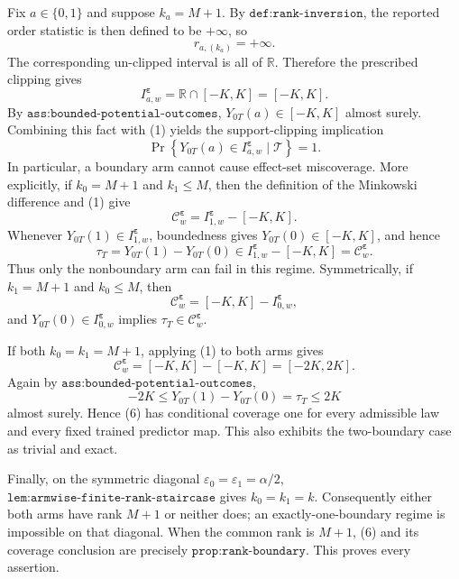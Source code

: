 Fix \(a\in\{0,1\}\) and suppose \(k_a=M+1\). By \(\texttt{def:rank-inversion}\), the reported order statistic is then defined to be \(+\infty\), so
\[
r_{a,(k_a)}=+\infty.
\]
The corresponding un-clipped interval is all of \(\mathbb R\). Therefore the prescribed clipping gives
\[
I^{\boldsymbol\varepsilon}_{a,w}=\mathbb R\cap[-K,K]=[-K,K].
\tag{1}
\]
By \(\texttt{ass:bounded-potential-outcomes}\), \(Y_{0T}(a)\in[-K,K]\) almost surely. Combining this fact with (1) yields the support-clipping implication
\[
\Pr\!\left\{Y_{0T}(a)\in I^{\boldsymbol\varepsilon}_{a,w}\mid\mathcal T\right\}=1.
\tag{2}
\]
In particular, a boundary arm cannot cause effect-set miscoverage. More explicitly, if \(k_0=M+1\) and \(k_1\le M\), then the definition of the Minkowski difference and (1) give
\[
\mathcal C^{\boldsymbol\varepsilon}_w=I^{\boldsymbol\varepsilon}_{1,w}-[-K,K].
\tag{3}
\]
Whenever \(Y_{0T}(1)\in I^{\boldsymbol\varepsilon}_{1,w}\), boundedness gives \(Y_{0T}(0)\in[-K,K]\), and hence
\[
\tau_T=Y_{0T}(1)-Y_{0T}(0)\in I^{\boldsymbol\varepsilon}_{1,w}-[-K,K]=\mathcal C^{\boldsymbol\varepsilon}_w.
\tag{4}
\]
Thus only the nonboundary arm can fail in this regime. Symmetrically, if \(k_1=M+1\) and \(k_0\le M\), then
\[
\mathcal C^{\boldsymbol\varepsilon}_w=[-K,K]-I^{\boldsymbol\varepsilon}_{0,w},
\tag{5}
\]
and \(Y_{0T}(0)\in I^{\boldsymbol\varepsilon}_{0,w}\) implies \(\tau_T\in\mathcal C^{\boldsymbol\varepsilon}_w\).

If both \(k_0=k_1=M+1\), applying (1) to both arms gives
\[
\mathcal C^{\boldsymbol\varepsilon}_w=[-K,K]-[-K,K]=[-2K,2K].
\tag{6}
\]
Again by \(\texttt{ass:bounded-potential-outcomes}\),
\[
-2K\le Y_{0T}(1)-Y_{0T}(0)=\tau_T\le2K
\]
almost surely. Hence (6) has conditional coverage one for every admissible law and every fixed trained predictor map. This also exhibits the two-boundary case as trivial and exact.

Finally, on the symmetric diagonal \(\varepsilon_0=\varepsilon_1=\alpha/2\), \(\texttt{lem:armwise-finite-rank-staircase}\) gives \(k_0=k_1=k\). Consequently either both arms have rank \(M+1\) or neither does; an exactly-one-boundary regime is impossible on that diagonal. When the common rank is \(M+1\), (6) and its coverage conclusion are precisely \(\texttt{prop:rank-boundary}\). This proves every assertion.